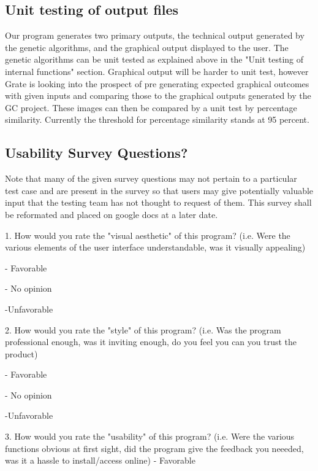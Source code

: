 \documentclass[12pt, titlepage]{article}
\begin{document}
\subsection{Unit testing of output files}		

Our program generates two primary outputs, the technical output generated by the genetic algorithms, and the graphical output displayed to the user. The genetic algorithms can be unit tested as explained above in the "Unit testing of internal functions" section. Graphical output will be harder to unit test, however Grate is looking into the prospect of pre generating expected graphical outcomes with given inputs and comparing those to the graphical outputs generated by the GC project. These images can then be compared by a unit test by percentage similarity. Currently the threshold for percentage similarity stands at 95 percent.





\newpage

\subsection{Usability Survey Questions?}

Note that many of the given survey questions may not pertain to a particular test case and are present in the survey so that users may give potentially valuable input that the testing team has not thought to request of them. This survey shall be reformated and placed on google docs at a later date.

1. How would you rate the "visual aesthetic" of this program? (i.e. Were the various elements of the user interface understandable, was it visually appealing)

- Favorable

- No opinion

-Unfavorable

2. How would you rate the "style" of this program? (i.e. Was the program professional enough, was it inviting enough,  do you feel you can you trust the product)

- Favorable

- No opinion

-Unfavorable

3. How would you rate the "usability" of this program? (i.e. Were the various functions obvious at first sight, did the program give the feedback you neeeded, was it a hassle to install/access online)
- Favorable
\end{document}
